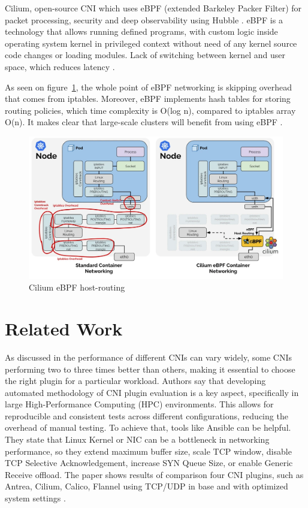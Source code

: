 Cilium, open-source CNI which uses eBPF (extended Barkeley Packer Filter) for packet processing, security and deep observability using Hubble \cite{CiliumOverview}. eBPF is a technology that allows running defined programs, with custom logic inside operating system kernel in privileged context without need of any kernel source code changes or loading modules. Lack of switching between kernel and user space, which reduces latency \cite{eBPF}. 

As seen on figure~\ref{fig:ebpf_routing}, the whole point of eBPF networking is skipping overhead that comes from iptables. Moreover, eBPF implements hash tables for storing routing policies, which time complexity is O(log n), compared to iptables array O(n). It makes clear that large-scale clusters will benefit from using eBPF \cite{IsovalentHash}. 

\begin{figure}[H]
    \centering
    \includegraphics[width=0.9\columnwidth]{images/ebpf_hostrouting.png}
    \caption{Cilium eBPF host-routing \cite{CiliumCNIBenchmark}}
    \label{fig:ebpf_routing}
\end{figure}




\section{Related Work}
\label{sec:realted_work}

As discussed in \cite{dakic2024performance} the performance of different CNIs can vary widely, some CNIs performing two to three times better than others, making it essential to choose the right plugin for a particular workload. Authors say that developing automated methodology of CNI plugin evaluation is a key aspect, specifically in large High-Performance Computing (HPC) environments. This allows for reproducible and consistent tests across different configurations, reducing the overhead of manual testing. To achieve that, tools like Ansible can be helpful. They state that Linux Kernel or NIC can be a bottleneck in networking performance, so they extend maximum buffer size, scale TCP window, disable TCP Selective Acknowledgement, increase SYN Queue Size, or enable Generic Receive offload. The paper shows results of comparison four CNI plugins, such as Antrea, Cilium, Calico, Flannel using TCP/UDP in base and with optimized system settings \cite{dakic2024performance}. 

